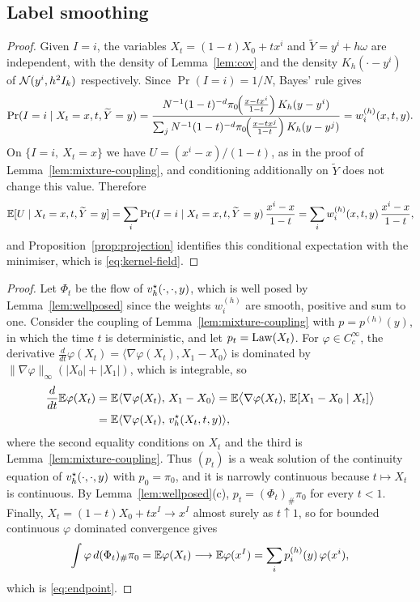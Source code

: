 \documentclass{article} %
\makeatletter
\newif\ificlr
\newcommand{\placeblock}[1]{\ificlr\@nameuse{moved@#1}\fi}
\newcommand{\iclrbr}{\\&}\newcommand{\iclrbrq}{\\&\qquad}\newcommand{\iclrqbr}{\\&}
\newcommand{\iclrbr}{}\newcommand{\iclrbrq}{}\newcommand{\iclrqbr}{\qquad}
\theoremstyle{plain}
\theoremstyle{definition}
\theoremstyle{remark}
\makeatother
\begin{document}
\subsection{Label smoothing}
\label{apx:pf-kernel}

\label{apx:pf-kernel-field}
\propkernelfield*
\begin{proof}
Given $I=i$, the variables $X_t=(1-t)X_0+tx^i$ and $\widetilde Y=y^i+h\omega$ are independent, with
the density of Lemma~\ref{lem:cov} and the density $K_h(\cdot-y^i)$ of $\mathcal{N}(y^i,h^2I_k)$
respectively. Since $\Pr(I=i)=1/N$, Bayes' rule gives
\[
\Pr(I=i\mid X_t=x,t,\widetilde Y=y)
=\frac{N^{-1}(1-t)^{-d}\pi_0\!\Big(\frac{x-tx^{i}}{1-t}\Big)\,K_h(y-y^{i})}{\sum_jN^{-1}(1-t)^{-d}\pi_0\!\Big(\frac{x-tx^{j}}{1-t}\Big)\,K_h(y-y^{j})}
=w_i^{(h)}(x,t,y).
\]
On $\{I=i,\ X_t=x\}$ we have $U=(x^i-x)/(1-t)$, as in the proof of
Lemma~\ref{lem:mixture-coupling}, and conditioning additionally on $\widetilde Y$ does not change
this value. Therefore
\[
\mathbb{E}[U\mid X_t=x,t,\widetilde Y=y]
=\sum_i\Pr(I=i\mid X_t=x,t,\widetilde Y=y)\,\frac{x^i-x}{1-t}
=\sum_iw_i^{(h)}(x,t,y)\,\frac{x^i-x}{1-t},
\]
and Proposition~\ref{prop:projection} identifies this conditional expectation with the minimiser,
which is \eqref{eq:kernel-field}.
\end{proof}
\placeblock{coupling}

\label{apx:pf-endpoint}
\thmendpoint*
\begin{proof}
Let $\Phi_t$ be the flow of $v_h^\star(\cdot,\cdot,y)$, which is well posed by
Lemma~\ref{lem:wellposed} since the weights $w_i^{(h)}$ are smooth, positive and sum to one.
Consider the coupling of Lemma~\ref{lem:mixture-coupling} with $p=p^{(h)}(y)$, in which the time
$t$ is deterministic, and let $p_t=\mathrm{Law}(X_t)$. For $\varphi\in C_c^\infty$, the derivative
$\frac{d}{dt}\varphi(X_t)=\langle\nabla\varphi(X_t),X_1-X_0\rangle$ is dominated by
$\|\nabla\varphi\|_\infty(|X_0|+|X_1|)$, which is integrable, so
\begin{align*}
\frac{d}{dt}\E\varphi(X_t)
&=\E\langle\nabla\varphi(X_t),\,X_1-X_0\rangle
=\E\bigl\langle\nabla\varphi(X_t),\,\E[X_1-X_0\mid X_t]\bigr\rangle
\iclrbr=\E\langle\nabla\varphi(X_t),\,\vstar(X_t,t,y)\rangle ,
\end{align*}
where the second equality conditions on $X_t$ and the third is Lemma~\ref{lem:mixture-coupling}.
Thus $(p_t)$ is a weak solution of the continuity equation of $v_h^\star(\cdot,\cdot,y)$ with
$p_0=\pi_0$, and it is narrowly continuous because $t\mapsto X_t$ is continuous. By
Lemma~\ref{lem:wellposed}(c), $p_t=(\Phi_t)_\#\pi_0$ for every $t<1$. Finally,
$X_t=(1-t)X_0+tx^I\to x^I$ almost surely as $t\uparrow1$, so for bounded continuous $\varphi$
dominated convergence gives
\[
\int\varphi\,d(\Phi_t)_\#\pi_0=\mathbb{E}\varphi(X_t)\longrightarrow\mathbb{E}\varphi(x^I)
=\sum_ip_i^{(h)}(y)\,\varphi(x^i),
\]
which is \eqref{eq:endpoint}.
\end{proof}
\end{document}
